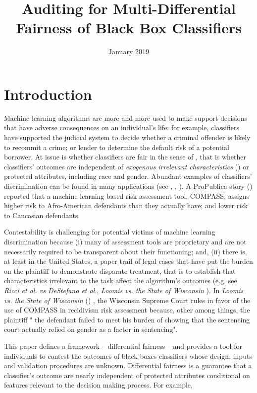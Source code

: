 \documentclass{article}
\title{Auditing for Multi-Differential Fairness of Black Box Classifiers}
\author{}
\date{January 2019}
\begin{document}
\maketitle
\section{Introduction}
Machine learning algorithms are more and more used to make support decisions that have adverse consequences on an individual's life: for example, classifiers have supported the judicial system to decide whether a criminal offender is likely to recommit a crime; or lender to determine the default risk of a potential borrower. At issue is whether classifiers are fair in the sense of \cite{calsamiglia2009decentralizing} , that is whether classifiers' outcomes are independent of \textit{exogenous irrelevant characteristics} (\cite{calsamiglia2009decentralizing}) or protected attributes, including race and gender. Abundant examples of classifiers' discrimination can be found in many applications (see \cite{NY2017}, \cite{atlantic2016}, \cite{ProPublica2016}). A ProPublica story (\cite{ProPublica2016}) reported that a machine learning based risk assessment tool, COMPASS, assigns higher risk to Afro-American defendants than they actually have; and lower risk to Caucasian defendants.

\bigskip
Contestability is challenging for potential victims of machine learning discrimination because (i) many of assessment tools are proprietary and are not necessarily required to be transparent about their functioning; and, (ii) there is, at least in the United States, a paper trail of legal cases that have put the burden on the plaintiff to demonstrate disparate treatment, that is to establish that characteristics irrelevant to the task affect the algorithm's outcomes (e.g. see \textit{Ricci et al. vs DeStefano et al.}\cite{Ricci}, \textit{Loomis vs. the State of Wisconsin} \cite{Loomis}). In  \textit{Loomis vs. the State of Wisconsin} (\cite{Loomis}) , the Wisconsin Supreme Court rules in favor of the use of COMPASS in recidivism risk assessment because, other among things, the plaintiff " the defendant failed to meet his burden of showing that the sentencing court actually relied on gender as a factor in sentencing". 
	
\bigskip
 This paper defines a framework -- differential fairness -- and provides a tool for individuals to contest the outcomes of black boxes classifiers whose design, inputs and validation procedures are unknown. Differential fairness is a guarantee that a classifier's outcome are nearly independent of protected attributes conditional on features relevant to the decision making process. For example, 
 
\end{document}

